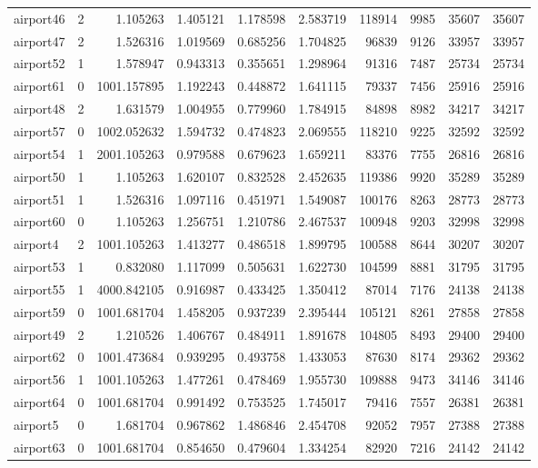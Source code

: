 \begin{longtable}{|l|r|r|r|r|r|r|r|r|r|}
airport46 & 2 & 1.105263 & 1.405121 & 1.178598 & 2.583719 & 118914 & 9985 & 35607 & 35607 \\
airport47 & 2 & 1.526316 & 1.019569 & 0.685256 & 1.704825 & 96839 & 9126 & 33957 & 33957 \\
airport52 & 1 & 1.578947 & 0.943313 & 0.355651 & 1.298964 & 91316 & 7487 & 25734 & 25734 \\
airport61 & 0 & 1001.157895 & 1.192243 & 0.448872 & 1.641115 & 79337 & 7456 & 25916 & 25916 \\
airport48 & 2 & 1.631579 & 1.004955 & 0.779960 & 1.784915 & 84898 & 8982 & 34217 & 34217 \\
airport57 & 0 & 1002.052632 & 1.594732 & 0.474823 & 2.069555 & 118210 & 9225 & 32592 & 32592 \\
airport54 & 1 & 2001.105263 & 0.979588 & 0.679623 & 1.659211 & 83376 & 7755 & 26816 & 26816 \\
airport50 & 1 & 1.105263 & 1.620107 & 0.832528 & 2.452635 & 119386 & 9920 & 35289 & 35289 \\
airport51 & 1 & 1.526316 & 1.097116 & 0.451971 & 1.549087 & 100176 & 8263 & 28773 & 28773 \\
airport60 & 0 & 1.105263 & 1.256751 & 1.210786 & 2.467537 & 100948 & 9203 & 32998 & 32998 \\
airport4 & 2 & 1001.105263 & 1.413277 & 0.486518 & 1.899795 & 100588 & 8644 & 30207 & 30207 \\
airport53 & 1 & 0.832080 & 1.117099 & 0.505631 & 1.622730 & 104599 & 8881 & 31795 & 31795 \\
airport55 & 1 & 4000.842105 & 0.916987 & 0.433425 & 1.350412 & 87014 & 7176 & 24138 & 24138 \\
airport59 & 0 & 1001.681704 & 1.458205 & 0.937239 & 2.395444 & 105121 & 8261 & 27858 & 27858 \\
airport49 & 2 & 1.210526 & 1.406767 & 0.484911 & 1.891678 & 104805 & 8493 & 29400 & 29400 \\
airport62 & 0 & 1001.473684 & 0.939295 & 0.493758 & 1.433053 & 87630 & 8174 & 29362 & 29362 \\
airport56 & 1 & 1001.105263 & 1.477261 & 0.478469 & 1.955730 & 109888 & 9473 & 34146 & 34146 \\
airport64 & 0 & 1001.681704 & 0.991492 & 0.753525 & 1.745017 & 79416 & 7557 & 26381 & 26381 \\
airport5 & 0 & 1.681704 & 0.967862 & 1.486846 & 2.454708 & 92052 & 7957 & 27388 & 27388 \\
airport63 & 0 & 1001.681704 & 0.854650 & 0.479604 & 1.334254 & 82920 & 7216 & 24142 & 24142 \\

\end{longtable}
